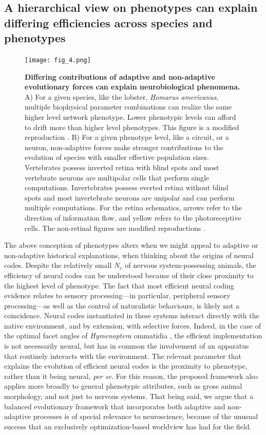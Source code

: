 \documentclass[twocolumn]{article}
\begin{document}
\subsection{A hierarchical view on phenotypes can explain differing efficiencies across species and phenotypes}

\begin{figure}[htp]
\centering
\texttt{[image: fig\_4.png]}
\caption{\textbf{Differing contributions of adaptive and non-adaptive evolutionary forces can explain neurobiological phenomena.} A) For a given species, like the lobster, \textit{Homarus americanus}, multiple biophysical parameter combinations can realize the same higher level network phenotype. Lower phenotypic levels can afford to drift more than higher level phenotypes. This figure is a modified reproduction \cite{prinz_marder_2004}. B) For a given phenotype level, like a circuit, or a neuron, non-adaptive forces make stronger contributions to the evolution of species with smaller effective population sizes. Vertebrates possess inverted retina with blind spots and most vertebrate neurons are multipolar cells that perform single computations. Invertebrates possess everted retina without blind spots and most invertebrate neurons are unipolar and can perform multiple computations. For the retina schematics, arrows refer to the direction of information flow, and yellow refers to the photoreceptive cells. The non-retinal figures are modified reproductions \cite{hu_bean_2018, Hendricks_Ha_Maffey_Zhang_2012}.}
\label{fig_examples}
\end{figure}

The above conception of phenotypes alters when we might appeal to adaptive or non-adaptive historical explanations, when thinking about the origins of neural codes. Despite the relatively small $N_e$ of nervous system-possessing animals, the efficiency of neural codes can be understood because of their close proximity to the highest level of phenotype. The fact that most efficient neural coding evidence relates to sensory processing---in particular, peripheral sensory processing---as well as the control of naturalistic behaviours, is likely not a coincidence. Neural codes instantiated in these systems interact directly with the native environment, and by extension, with selective forces. Indeed, in the case of the optimal facet angles of \textit{Hymenoptera} ommatidia \cite{barlow_1952}, the efficient implementation is not necessarily neural, but has in common the involvement of an apparatus that routinely interacts with the environment. The relevant parameter that explains the evolution of efficient neural codes is the proximity to phenotype, rather than it being neural, \textit{per se}. For this reason, the proposed framework also applies more broadly to general phenotypic attributes, such as gross animal morphology, and not just to nervous systems. That being said, we argue that a balanced evolutionary framework that incorporates both adaptive and non-adaptive processes is of special relevance to neuroscience, because of the unusual success that an exclusively optimization-based worldview has had for the field.
\end{document}
